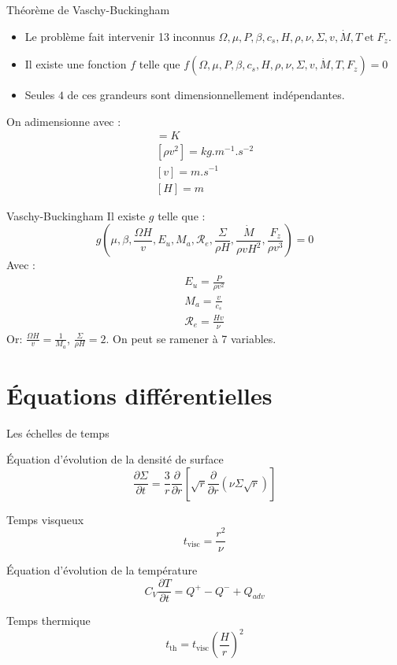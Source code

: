 \documentclass{beamer}
\begin{document}
\begin{frame}{Théorème de Vaschy-Buckingham}
  \begin{itemize}
  \item Le problème fait intervenir 13 inconnus $\Omega,\mu,P,\beta,c_s,H,\rho,\nu,\Sigma,v,\dot{M},T\;\textrm{et}\;F_z$.
  \item Il existe une fonction $f$ telle que $f(\Omega,\mu,P,\beta,c_s,H,\rho,\nu,\Sigma,v,\dot{M},T,F_z)=0$
  \item Seules $4$ de ces grandeurs sont dimensionnellement indépendantes.
  \end{itemize}
  On adimensionne avec :
  \begin{align}
  [T]=K\\
  [\rho v^2]=kg.m^{-1}.s^{-2}\\
  [v]=m.s^{-1}\\
  [H]=m
  \end{align}
\end{frame}

\begin{frame}{Vaschy-Buckingham}
  Il existe $g$ telle que :
  \begin{equation}
    g(\mu,\beta,\frac{\Omega H}{v},E_u,M_a,\mathcal{R}_e,\frac{\Sigma}{\rho H},\frac{\dot{M}}{\rho vH^2},\frac{F_z}{\rho v^3})=0
  \end{equation}
  Avec :
  \begin{align}
    E_u=\frac{P}{\rho v^2}\\
    M_a=\frac{v}{c_s}\\
    \mathcal{R}_e=\frac{Hv}{\nu}
  \end{align}
  Or: $\frac{\Omega H}{v}=\frac{1}{M_a}$, $\frac{\Sigma}{\rho H}=2$.
  On peut se ramener à 7 variables.
\end{frame}

\section{Équations différentielles}

\begin{frame}{Les échelles de temps}

Équation d'évolution de la densité de surface
\begin{equation}
    \frac{\partial {\Sigma}}{\partial t} = \frac{3}{r}\frac{\partial}{\partial r}\left[\sqrt{r}\frac{\partial}{\partial r}(\nu \Sigma\sqrt{r})\right]
    \end{equation}
\begin{block}{Temps visqueux}
\[
 t_\text{visc} = \frac{r^2}{\nu}
\]
\end{block}

Équation d'évolution de la température
\begin{equation}
    C_V \frac{\partial T}{\partial t}=Q^+ - Q^- +Q_{adv}
\end{equation}
\begin{block}{Temps thermique}
\[
t_\text{th} = t_\text{visc} \left(\frac{H}{r}\right)^2
\]
\end{block}
\end{frame}
\end{document}
